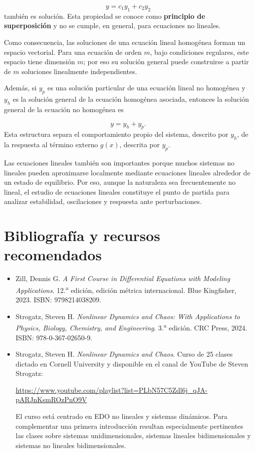 \documentclass[12pt,a4paper]{article}
\begin{document}
	\[
	y=c_1y_1+c_2y_2
	\]
	también es solución. Esta propiedad se conoce como \textbf{principio de superposición} y no se cumple, en general, para ecuaciones no lineales.
	
	Como consecuencia, las soluciones de una ecuación lineal homogénea forman un espacio vectorial. Para una ecuación de orden \(m\), bajo condiciones regulares, este espacio tiene dimensión \(m\); por eso su solución general puede construirse a partir de \(m\) soluciones linealmente independientes.
	
	Además, si \(y_p\) es una solución particular de una ecuación lineal no homogénea y \(y_h\) es la solución general de la ecuación homogénea asociada, entonces la solución general de la ecuación no homogénea es
	
	\[
	y=y_h+y_p.
	\]
	Esta estructura separa el comportamiento propio del sistema, descrito por \(y_h\), de la respuesta al término externo \(g(x)\), descrita por \(y_p\).
	
	Las ecuaciones lineales también son importantes porque muchos sistemas no lineales pueden aproximarse localmente mediante ecuaciones lineales alrededor de un estado de equilibrio. Por eso, aunque la naturaleza sea frecuentemente no lineal, el estudio de ecuaciones lineales constituye el punto de partida para analizar estabilidad, oscilaciones y respuesta ante perturbaciones.
	
	\clearpage
	\section*{Bibliografía y recursos recomendados}
	
	\begin{itemize}[leftmargin=*]
		\item Zill, Dennis G. \textit{A First Course in Differential Equations with Modeling Applications}. 12.\textsuperscript{a} edición, edición métrica internacional. Blue Kingfisher, 2023. ISBN: 9798214038209.
		
		\item Strogatz, Steven H. \textit{Nonlinear Dynamics and Chaos: With Applications to Physics, Biology, Chemistry, and Engineering}. 3.\textsuperscript{a} edición. CRC Press, 2024. ISBN: 978-0-367-02650-9.
		
		\item Strogatz, Steven H. \textit{Nonlinear Dynamics and Chaos}. Curso de 25 clases dictado en Cornell University y disponible en el canal de YouTube de Steven Strogatz:
		
		\begin{center}
			\url{https://www.youtube.com/playlist?list=PLbN57C5Zdl6j_qJA-pARJnKsmROzPnO9V}
		\end{center}
		
		El curso está centrado en EDO no lineales y sistemas dinámicos. Para complementar una primera introducción resultan especialmente pertinentes las clases sobre sistemas unidimensionales, sistemas lineales bidimensionales y sistemas no lineales bidimensionales.
	\end{itemize}
	
\end{document}
